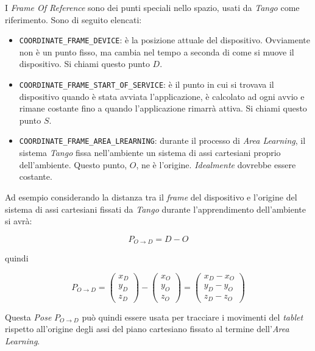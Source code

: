 \begin{pose}
	I \emph{Frame Of Reference} sono dei punti speciali nello spazio, usati da \emph{Tango} come riferimento. Sono di seguito elencati:
	\begin{itemize}
		\item \texttt{COORDINATE\_FRAME\_DEVICE}: è la posizione attuale del dispositivo. Ovviamente non è un punto fisso, ma cambia nel tempo a seconda di come si muove il dispositivo. Si chiami questo punto $D$.
		\item \texttt{COORDINATE\_FRAME\_START\_OF\_SERVICE}: è il punto in cui si trovava il dispositivo quando è stata avviata l'applicazione, è calcolato ad ogni avvio e rimane costante fino a quando l'applicazione rimarrà attiva. Si chiami questo punto $S$.
		\item \texttt{COORDINATE\_FRAME\_AREA\_LREARNING}: durante il processo di \emph{Area Learning}, il sistema \emph{Tango} fissa nell'ambiente un sistema di assi cartesiani proprio dell'ambiente. Questo punto, $O$, ne è l'origine. \textit{Idealmente} dovrebbe essere costante.
	\end{itemize}
\end{pose}
Ad esempio considerando la distanza tra il \emph{frame} del dispositivo e l'origine del sistema di assi cartesiani fissati da \emph{Tango} durante l'apprendimento dell'ambiente si avrà:

$$P_{O \rightarrow D} = D - O$$

quindi

$$
	P_{O \rightarrow D} =
	\begin{pmatrix} x_{D} \\ y_{D} \\ z_{D} \end{pmatrix} -
	\begin{pmatrix} x_{O} \\ y_{O} \\ z_{O} \end{pmatrix} =
	\begin{pmatrix}
		x_{D} - x_{O} \\
	 	y_{D} - y_{O} \\
	 	z_{D} - z_{O}
	\end{pmatrix}
$$

Questa \emph{Pose} $P_{O \rightarrow D}$ può quindi essere usata per tracciare i movimenti del \emph{tablet} rispetto all'origine degli assi del piano cartesiano fissato al termine dell'\emph{Area Learning}.\\

